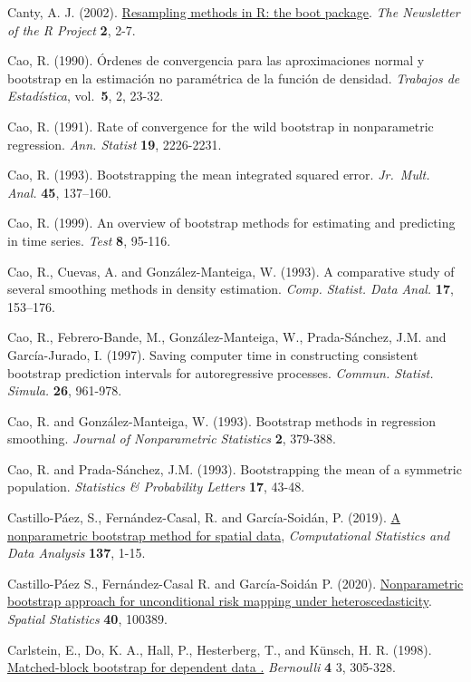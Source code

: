 \documentclass[
]{book}
\theoremstyle{break}
\theoremstyle{nonumberplain}
\begin{document}
Canty, A. J. (2002). \href{https://www.r-project.org/doc/Rnews/Rnews_2002-3.pdf}{Resampling methods in R: the boot package}.
\emph{The Newsletter of the R Project} \textbf{2}, 2-7.

Cao, R. (1990). Órdenes de convergencia para las aproximaciones normal y
bootstrap en la estimación no paramétrica de la función de densidad.
\emph{Trabajos de Estadística}, vol.~\textbf{5}, 2, 23-32.

Cao, R. (1991). Rate of convergence for the wild bootstrap in
nonparametric regression. \emph{Ann. Statist} \textbf{19}, 2226-2231.

Cao, R. (1993). Bootstrapping the mean integrated squared error.
\emph{Jr.~Mult. Anal.} \textbf{45}, 137--160.

Cao, R. (1999). An overview of bootstrap methods for estimating and
predicting in time series. \emph{Test} \textbf{8}, 95-116.

Cao, R., Cuevas, A. and González-Manteiga, W. (1993). A comparative
study of several smoothing methods in density estimation.
\emph{Comp. Statist. Data Anal.} \textbf{17}, 153--176.

Cao, R., Febrero-Bande, M., González-Manteiga, W., Prada-Sánchez, J.M.
and García-Jurado, I. (1997). Saving computer time in constructing
consistent bootstrap prediction intervals for autoregressive processes.
\emph{Commun. Statist. Simula.} \textbf{26}, 961-978.

Cao, R. and González-Manteiga, W. (1993). Bootstrap methods in
regression smoothing. \emph{Journal of Nonparametric Statistics} \textbf{2},
379-388.

Cao, R. and Prada-Sánchez, J.M. (1993). Bootstrapping the mean of a
symmetric population. \emph{Statistics \& Probability Letters} \textbf{17}, 43-48.

Castillo-Páez, S., Fernández-Casal, R. and García-Soidán, P. (2019).
\href{https://www.sciencedirect.com/science/article/pii/S0167947319300325?via\%3Dihub}{A nonparametric bootstrap method for spatial data},
\emph{Computational Statistics and Data Analysis} \textbf{137}, 1-15.

Castillo-Páez S., Fernández-Casal R. and García-Soidán P. (2020).
\href{https://www.sciencedirect.com/science/article/pii/S221167531930140X}{Nonparametric bootstrap approach for unconditional risk mapping under heteroscedasticity}.
\emph{Spatial Statistics} \textbf{40}, 100389.

Carlstein, E., Do, K. A., Hall, P., Hesterberg, T., and Künsch, H. R. (1998). \href{https://projecteuclid.org/euclid.bj/1174324983}{Matched-block bootstrap for dependent data .}
\emph{Bernoulli} \textbf{4} 3, 305-328.
\end{document}
